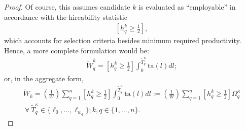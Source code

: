 \documentclass[hidelinks, nonatbib]{elsarticle}
\begin{document}
\begin{corollary}
\begin{proof}
        Of course, this assumes candidate $k$ is evaluated as ``employable'' in accordance with the hireability statistic
        \begin{gather}
            \left[
                h_{q}^{k}
                \geq
                \frac{1}{2}
            \right]
            ,
        \end{gather}
        which accounts for selection criteria besides minimum required productivity. Hence, a more complete formulation would be:
        \begin{gather}
            \tilde{W}_{q}^{k}
            =
            \left[
                h_{q}^{k}
                \geq
                \frac{1}{2}
            \right]
            \int_{0}^{\tilde{T}_{q}^{\kappa}}
            \text{ta}(l)
            dl
            ;
        \end{gather}
        or, in the aggregate form,
        \begin{gather}
            \tilde{W}_k 
            = 
            \left(
                \frac{1}{W}
            \right)
            \sum_{q=1}^{n}
            \left[
                h_{q}^{k}
                \geq
                \frac{1}{2}
            \right]
            \int_{0}^{\tilde{T}_{q}^{\kappa}}
            \text{ta}(l)
            dl
            :=
            \left(
                \frac{1}{W}
            \right)
            \sum_{q=1}^{n}
            \left[
                h_{q}^{k}
                \geq
                \frac{1}{2}
            \right]
            \Omega_{q}^{\kappa}
            \\
            \
            \forall
            \
            \tilde{T}_{q}^{\kappa} \in \{
                \ell_{0}, 
                \dots, 
                \ell_{w_q}
            \}
            ;
            k,q \in \{1, \dots, n\}
            .
        \end{gather}
    \end{proof}        
\end{corollary}

\end{document}
